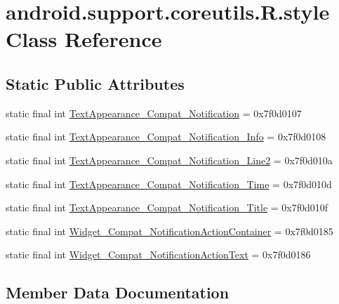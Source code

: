 \hypertarget{classandroid_1_1support_1_1coreutils_1_1R_1_1style}{}\section{android.\+support.\+coreutils.\+R.\+style Class Reference}
\label{classandroid_1_1support_1_1coreutils_1_1R_1_1style}
\subsection*{Static Public Attributes}
\begin{DoxyCompactItemize}
\item 
static final int \mbox{\hyperlink{classandroid_1_1support_1_1coreutils_1_1R_1_1style_ae4820cdb0f0f4de3aa8afc1087767854}{Text\+Appearance\+\_\+\+Compat\+\_\+\+Notification}} = 0x7f0d0107
\item 
static final int \mbox{\hyperlink{classandroid_1_1support_1_1coreutils_1_1R_1_1style_a1ba61728862fe706cb77cda66c930df9}{Text\+Appearance\+\_\+\+Compat\+\_\+\+Notification\+\_\+\+Info}} = 0x7f0d0108
\item 
static final int \mbox{\hyperlink{classandroid_1_1support_1_1coreutils_1_1R_1_1style_a02a4f99f910a1f530fde40720bde5afe}{Text\+Appearance\+\_\+\+Compat\+\_\+\+Notification\+\_\+\+Line2}} = 0x7f0d010a
\item 
static final int \mbox{\hyperlink{classandroid_1_1support_1_1coreutils_1_1R_1_1style_a725275630f27491b0eb990f533b28990}{Text\+Appearance\+\_\+\+Compat\+\_\+\+Notification\+\_\+\+Time}} = 0x7f0d010d
\item 
static final int \mbox{\hyperlink{classandroid_1_1support_1_1coreutils_1_1R_1_1style_a619695923ae29ca0adff63e8b9e6c5ca}{Text\+Appearance\+\_\+\+Compat\+\_\+\+Notification\+\_\+\+Title}} = 0x7f0d010f
\item 
static final int \mbox{\hyperlink{classandroid_1_1support_1_1coreutils_1_1R_1_1style_ac2adbd575145c1834e20adaf6344014b}{Widget\+\_\+\+Compat\+\_\+\+Notification\+Action\+Container}} = 0x7f0d0185
\item 
static final int \mbox{\hyperlink{classandroid_1_1support_1_1coreutils_1_1R_1_1style_afecf35538e16fa5d87a95f377bcd856d}{Widget\+\_\+\+Compat\+\_\+\+Notification\+Action\+Text}} = 0x7f0d0186
\end{DoxyCompactItemize}


\subsection{Member Data Documentation}
\mbox{\label{classandroid_1_1support_1_1coreutils_1_1R_1_1style_ae4820cdb0f0f4de3aa8afc1087767854}} 
